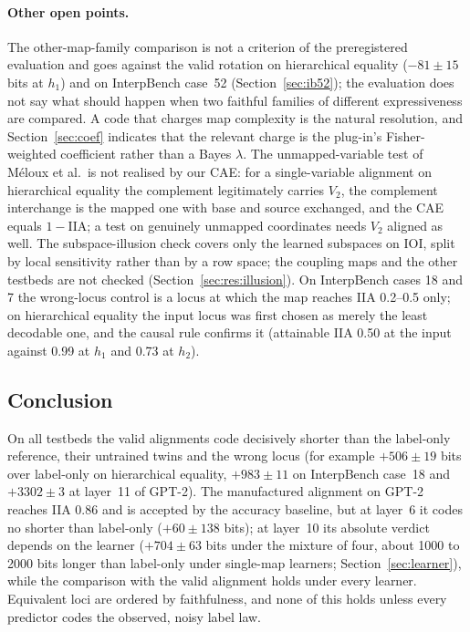 \documentclass[11pt,a4paper]{article}
\begin{document}
\paragraph{Other open points.} The other-map-family comparison is not a criterion of the preregistered evaluation and goes against the valid rotation on hierarchical equality ($-81\pm15$ bits at $h_1$) and on InterpBench case~52 (Section~\ref{sec:ib52}); the evaluation does not say what should happen when two faithful families of different expressiveness are compared. A code that charges map complexity is the natural resolution, and Section~\ref{sec:coef} indicates that the relevant charge is the plug-in's Fisher-weighted coefficient rather than a Bayes $\lambda$. The unmapped-variable test of Méloux et al.\ is not realised by our CAE: for a single-variable alignment on hierarchical equality the complement legitimately carries $V_2$, the complement interchange is the mapped one with base and source exchanged, and the CAE equals $1-\mathrm{IIA}$; a test on genuinely unmapped coordinates needs $V_2$ aligned as well. The subspace-illusion check covers only the learned subspaces on IOI, split by local sensitivity rather than by a row space; the coupling maps and the other testbeds are not checked (Section~\ref{sec:res:illusion}). On InterpBench cases 18 and 7 the wrong-locus control is a locus at which the map reaches IIA 0.2--0.5 only; on hierarchical equality the input locus was first chosen as merely the least decodable one, and the causal rule confirms it (attainable IIA 0.50 at the input against 0.99 at $h_1$ and 0.73 at $h_2$).

\subsection{Conclusion}
\label{sec:conclusion}

On all testbeds the valid alignments code decisively shorter than the label-only reference, their untrained twins and the wrong locus (for example $+506\pm19$ bits over label-only on hierarchical equality, $+983\pm11$ on InterpBench case~18 and $+3302\pm3$ at layer~11 of GPT-2). The manufactured alignment on GPT-2 reaches IIA 0.86 and is accepted by the accuracy baseline, but at layer~6 it codes no shorter than label-only ($+60\pm138$ bits); at layer~10 its absolute verdict depends on the learner ($+704\pm63$ bits under the mixture of four, about 1000 to 2000 bits longer than label-only under single-map learners; Section~\ref{sec:learner}), while the comparison with the valid alignment holds under every learner. Equivalent loci are ordered by faithfulness, and none of this holds unless every predictor codes the observed, noisy label law.
\end{document}
